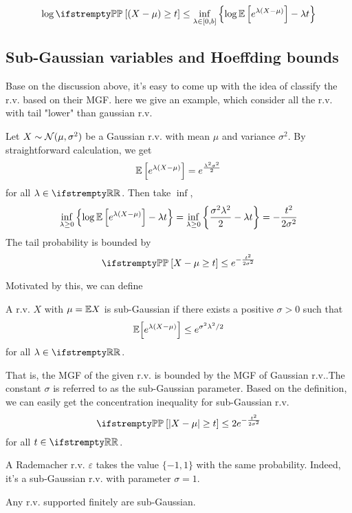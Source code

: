 \documentclass{paper}
\begin{document}
\[
	\log \PP\left[(X-\mu)\geq t\right] \leq \inf_{\lambda\in[0, b]}\left\{\log\EE\left[e^{\lambda(X-\mu)}\right] - \lambda t\right\}
\]
\subsection{Sub-Gaussian variables and Hoeffding bounds}
Base on the discussion above, it's easy to come up with the idea of classify the r.v. based on their MGF. here we give an example, which consider all the r.v. with tail "lower" than gaussian r.v.

\begin{exmp}
	Let $X\sim \mathcal{N}(\mu, \sigma^2)$ be a Gaussian r.v. with mean $\mu$ and variance $\sigma^2$. By straightforward calculation, we get
	\[
		\mathbb{E}\left[e^{\lambda (X-\mu)}\right] = e^{\frac{\lambda^2\sigma^2}{2}}
	\]
	for all $\lambda \in \RR$. Then take $\inf$,
	\[
		\inf_{\lambda\geq 0}\left\{\log\mathbb{E}\left[e^{\lambda(X-\mu)}\right]-\lambda t\right\} = \inf_{\lambda\geq 0}\left\{\frac{\sigma^2\lambda^2}{2}-\lambda t\right\} = -\frac{t^2}{2\sigma^2}
	\]
	The tail probability is bounded by
	\[
		\PP\left[X-\mu\geq t\right] \leq e^{-\frac{t^2}{2\sigma^2}}
	\]
\end{exmp}
Motivated by this, we can define
\begin{defn}
	A r.v. $X$ with $\mu=\mathbb{E} X$ is sub-Gaussian if there exists a positive $\sigma>0$ such that
	\[
		\mathbb{E}{\left[e^{\lambda(X-\mu)}\right]}	 \leq e^{\sigma^2\lambda^2/2}
	\]
	for all $\lambda \in\RR$.
\end{defn}
That is, the MGF of the given r.v. is bounded by the MGF of Gaussian r.v..The constant $\sigma$ is referred to as the sub-Gaussian parameter. Based on the definition, we can easily get the concentration inequality for sub-Gaussian r.v.
\[
	\PP\left[\vert X-\mu\vert \geq t\right] \leq 2e^{-\frac{t^2}{2\sigma^2}}
\]
for all $t\in\RR$.
\begin{exmp}
	A Rademacher r.v. $\varepsilon$ takes the value $\{-1, 1\}$ with the same probability. Indeed, it's a sub-Gaussian r.v. with parameter $\sigma=1$.
\end{exmp}
\begin{claim}
	Any r.v. supported finitely are sub-Gaussian.
\end{claim}
\end{document}
